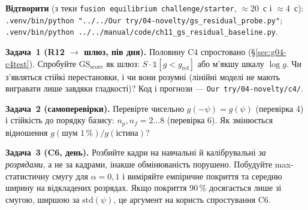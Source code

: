 \begin{practicum}
\textbf{Відтворити} (з теки \texttt{fusion equilibrium challenge/starter}, $\approx$20~с і $\approx$4~с):
\texttt{.venv/bin/python "../../Our try/04-novelty/gs\_residual\_probe.py"}; \texttt{.venv/bin/python ../../manual/code/ch11\_gs\_residual\_baseline.py}.

\textbf{Задача~1 (R12 $\to$ шлюз, пів дня).} Половину C4 спростовано (\S\ref{sec:g04-c4test}). Спробуйте $\mathrm{GS}_{\mathrm{score}}$ як шлюз: $S\cdot\mathbb 1[g<g_{\mathrm{ref}}]$ або м'якшу шкалу $\log g$. Чи з'являться стійкі перестановки, і чи вони розумні (лінійні моделі не мають вигравати лише завдяки гладкості)? Код і прогнози --- \texttt{Our try/04-novelty/c4/}.

\textbf{Задача~2 (самоперевірки).} Перевірте чисельно $g(-\psi)=g(\psi)$ (перевірка 4) і стійкість до порядку базису: $n_p,n_f=2\ldots8$ (перевірка 6). Як змінюється відношення $g(\text{шум }1\,\%)/g(\text{істина})$?

\textbf{Задача~3 (C6, день).} Розбийте кадри на навчальні й калібрувальні \emph{за розрядами}, а не за кадрами, інакше обмінюваність порушено. Побудуйте max-статистичну смугу для $\alpha=0{,}1$ і виміряйте емпіричне покриття та середню ширину на відкладених розрядах. Якщо покриття 90\,\% досягається лише зі смугою, ширшою за $\mathrm{std}(\psi)$, це аргумент на користь спростування C6.
\end{practicum}
